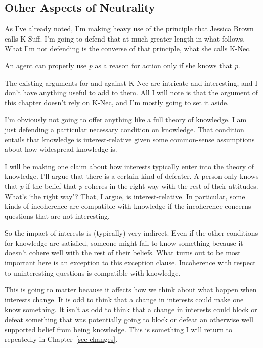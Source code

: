\documentclass[
  10pt,
  letterpaper,
  twoside]{scrbook}
\providecommand{\tightlist}{%
  \setlength{\itemsep}{0pt}\setlength{\parskip}{0pt}}\usepackage{longtable,booktabs,array}
\begin{document}
\subsection{Other Aspects of Neutrality}\label{sec-neutrality-k-nec}

As I've already noted, I'm making heavy use of the principle that
Jessica Brown calls K-Suff. I'm going to defend that at much greater
length in what follows. What I'm not defending is the converse of that
principle, what she calls K-Nec.

\begin{description}
\tightlist
\item[K-Nec]
An agent can properly use \emph{p} as a reason for action only if she
knows that \emph{p}.
\end{description}

The existing arguments for and against K-Nec are intricate and
interesting, and I don't have anything useful to add to them. All I will
note is that the argument of this chapter doesn't rely on K-Nec, and I'm
mostly going to set it aside.

I'm obviously not going to offer anything like a full theory of
knowledge. I am just defending a particular necessary condition on
knowledge. That condition entails that knowledge is interest-relative
given some common-sense assumptions about how widespread knowledge is.

I will be making one claim about how interests typically enter into the
theory of knowledge. I'll argue that there is a certain kind of
defeater. A person only knows that \emph{p} if the belief that \emph{p}
coheres in the right way with the rest of their attitudes. What's `the
right way'? That, I argue, is interest-relative. In particular, some
kinds of incoherence are compatible with knowledge if the incoherence
concerns questions that are not interesting.

So the impact of interests is (typically) very indirect. Even if the
other conditions for knowledge are satisfied, someone might fail to know
something because it doesn't cohere well with the rest of their beliefs.
What turns out to be most important here is an exception to this
exception clause. Incoherence with respect to uninteresting questions is
compatible with knowledge.

This is going to matter because it affects how we think about what
happen when interests change. It is odd to think that a change in
interests could make one know something. It isn't as odd to think that a
change in interests could block or defeat something that was potentially
going to block or defeat an otherwise well supported belief from being
knowledge. This is something I will return to repeatedly in
Chapter~\ref{sec-changes}.
\end{document}
